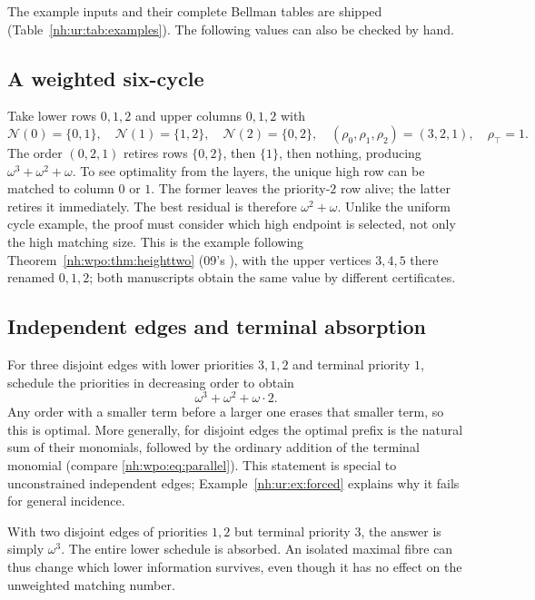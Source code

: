 \documentclass[11pt,a4paper]{article}
\theoremstyle{definition}
\theoremstyle{remark}
\newcommand{\Nb}{\mathcal N}
\newcommand{\rtop}{\rho_{\top}}
\begin{document}
The example inputs and their complete Bellman tables are shipped
(Table~\ref{nh:ur:tab:examples}). The following values can also be checked by
hand.

\subsection{A weighted six-cycle}
Take lower rows $0,1,2$ and upper columns $0,1,2$ with
\[
 \Nb(0)=\{0,1\},\quad \Nb(1)=\{1,2\},\quad \Nb(2)=\{0,2\},
 \quad (\rho_0,\rho_1,\rho_2)=(3,2,1),\quad\rtop=1.
\]
The order $(0,2,1)$ retires rows $\{0,2\}$, then $\{1\}$, then nothing,
producing $\omega^3+\omega^2+\omega$. To see optimality from the layers, the
unique high row can be matched to column $0$ or $1$. The former leaves the
priority-$2$ row alive; the latter retires it immediately. The best residual
is therefore $\omega^2+\omega$. Unlike the uniform cycle example, the proof
must consider which high endpoint is selected, not only the high matching
size. This is the example following Theorem~\ref{nh:wpo:thm:heighttwo}
(09's ), with the upper vertices
$3,4,5$ there renamed $0,1,2$; both manuscripts obtain the same value by
different certificates.

\subsection{Independent edges and terminal absorption}
For three disjoint edges with lower priorities $3,1,2$ and terminal priority
$1$, schedule the priorities in decreasing order to obtain
\[
 \omega^3+\omega^2+\omega\cdot2.
\]
Any order with a smaller term before a larger one erases that smaller term,
so this is optimal. More generally, for disjoint edges the optimal prefix is
the natural sum of their monomials, followed by the ordinary addition of the
terminal monomial (compare \eqref{nh:wpo:eq:parallel}). This statement is
special to unconstrained independent edges; Example~\ref{nh:ur:ex:forced}
explains why it fails for general incidence.

With two disjoint edges of priorities $1,2$ but terminal priority $3$, the
answer is simply $\omega^3$. The entire lower schedule is absorbed. An
isolated maximal fibre can thus change which lower information survives, even
though it has no effect on the unweighted matching number.
\end{document}
